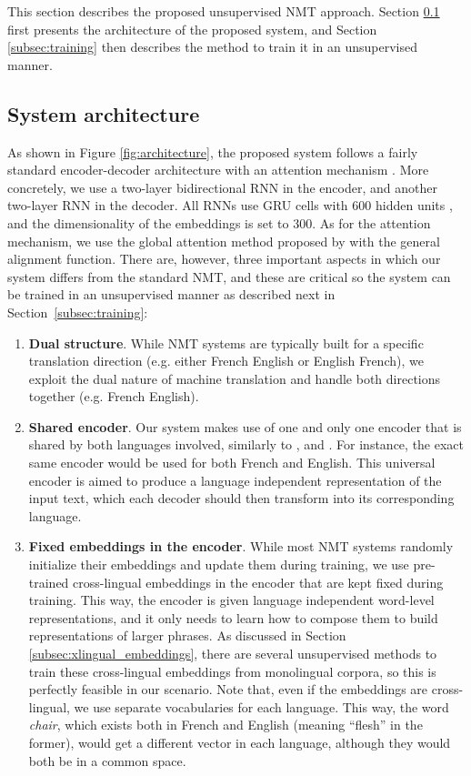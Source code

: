 \documentclass{article} \usepackage{iclr2018_conference,times}
\begin{document}
This section describes the proposed unsupervised NMT approach. Section \ref{subsec:architecture} first presents the architecture of the proposed system, and Section \ref{subsec:training} then describes the method to train it in an unsupervised manner.

\subsection{System architecture} 
\label{subsec:architecture}

As shown in Figure \ref{fig:architecture}, the proposed system follows a fairly standard encoder-decoder architecture with an attention mechanism \citep{bahdanau2014neural}. More concretely, we use a two-layer bidirectional RNN in the encoder, and another two-layer RNN in the decoder. All RNNs use GRU cells with 600 hidden units \citep{cho2014learning}, and the dimensionality of the embeddings is set to 300. As for the attention mechanism, we use the global attention method proposed by \citet{luong2015effective} with the general alignment function. There are, however, three important aspects in which our system differs from the standard NMT, and these are critical so the system can be trained in an unsupervised manner as described next in Section~\ref{subsec:training}:
\begin{enumerate}
\item \textbf{Dual structure}. While NMT systems are typically built for a specific translation direction (e.g. either French  English or English  French), we exploit the dual nature of machine translation \citep{he2016dual,firat2016multi} and handle both directions together (e.g. French  English).

\item \textbf{Shared encoder}. Our system makes use of one and only one encoder that is shared by both languages involved, similarly to \citet{ha2016toward}, \citet{lee2017fully} and \citet{johnson2017google}. For instance, the exact same encoder would be used for both French and English. This universal encoder is aimed to produce a language independent representation of the input text, which each decoder should then transform into its corresponding language.

\item \textbf{Fixed embeddings in the encoder}. While most NMT systems randomly initialize their embeddings and update them during training, we use pre-trained cross-lingual embeddings in the encoder that are kept fixed during training. This way, the encoder is given language independent word-level representations, and it only needs to learn how to compose them to build representations of larger phrases. As discussed in Section \ref{subsec:xlingual_embeddings}, there are several unsupervised methods to train these cross-lingual embeddings from monolingual corpora, so this is perfectly feasible in our scenario. Note that, even if the embeddings are cross-lingual, we use separate vocabularies for each language. This way, the word \textit{chair}, which exists both in French and English (meaning ``flesh'' in the former), would get a different vector in each language, although they would both be in a common space.
\end{enumerate}
\end{document}
